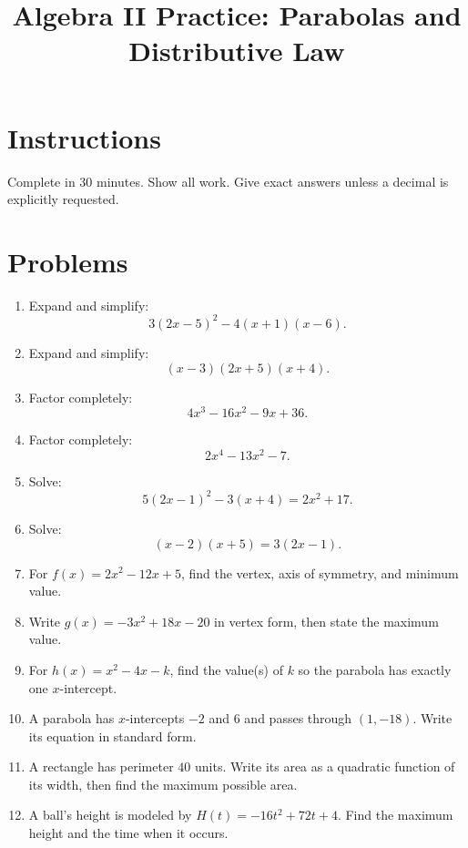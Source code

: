 \documentclass[12pt]{article}
\title{Algebra II Practice: Parabolas and Distributive Law}
\author{}
\date{}
\begin{document}
\maketitle

\section*{Instructions}
Complete in 30 minutes. Show all work. Give exact answers unless a decimal is explicitly requested.

\section*{Problems}
\begin{enumerate}[leftmargin=*, itemsep=1.0em, topsep=0.8em]
  \item Expand and simplify:
  \[
  3(2x-5)^2-4(x+1)(x-6).
  \]

  \item Expand and simplify:
  \[
  (x-3)(2x+5)(x+4).
  \]

  \item Factor completely:
  \[
  4x^3-16x^2-9x+36.
  \]

  \item Factor completely:
  \[
  2x^4-13x^2-7.
  \]

  \item Solve:
  \[
  5(2x-1)^2-3(x+4)=2x^2+17.
  \]

  \item Solve:
  \[
  (x-2)(x+5)=3(2x-1).
  \]

  \item For $f(x)=2x^2-12x+5$, find the vertex, axis of symmetry, and minimum value.

  \item Write $g(x)=-3x^2+18x-20$ in vertex form, then state the maximum value.

  \item For $h(x)=x^2-4x-k$, find the value(s) of $k$ so the parabola has exactly one $x$-intercept.

  \item A parabola has $x$-intercepts $-2$ and $6$ and passes through $(1,-18)$. Write its equation in standard form.

  \item A rectangle has perimeter $40$ units. Write its area as a quadratic function of its width, then find the maximum possible area.

  \item A ball's height is modeled by $H(t)=-16t^2+72t+4$. Find the maximum height and the time when it occurs.
\end{enumerate}
\end{document}
